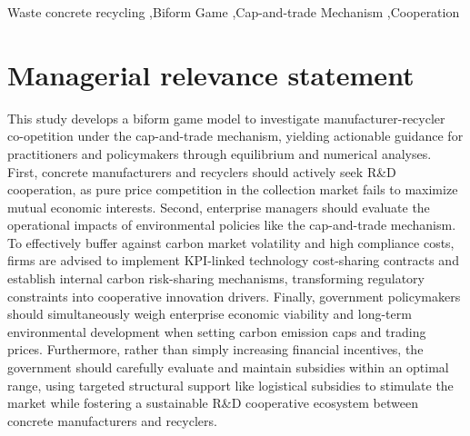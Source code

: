 \documentclass[authoryear,preprint,review,times,10pt]{elsarticle}
\begin{document}
\begin{frontmatter}
\begin{abstract}
\end{abstract}

\begin{keyword}
Waste concrete recycling \sep Biform Game \sep Cap-and-trade Mechanism \sep Cooperation
\end{keyword}

\end{frontmatter}

\section*{Managerial relevance statement}
This study develops a biform game model to investigate manufacturer-recycler co-opetition under the cap-and-trade mechanism, yielding actionable guidance for practitioners and policymakers through equilibrium and numerical analyses. First, concrete manufacturers and recyclers should actively seek R\&D cooperation, as pure price competition in the collection market fails to maximize mutual economic interests. Second, enterprise managers should evaluate the operational impacts of environmental policies like the cap-and-trade mechanism. To effectively buffer against carbon market volatility and high compliance costs, firms are advised to implement KPI-linked technology cost-sharing contracts and establish internal carbon risk-sharing mechanisms, transforming regulatory constraints into cooperative innovation drivers. Finally, government policymakers should simultaneously weigh enterprise economic viability and long-term environmental development when setting carbon emission caps and trading prices. Furthermore, rather than simply increasing financial incentives, the government should carefully evaluate and maintain subsidies within an optimal range, using targeted structural support like logistical subsidies to stimulate the market while fostering a sustainable R\&D cooperative ecosystem between concrete manufacturers and recyclers.
\end{document}
